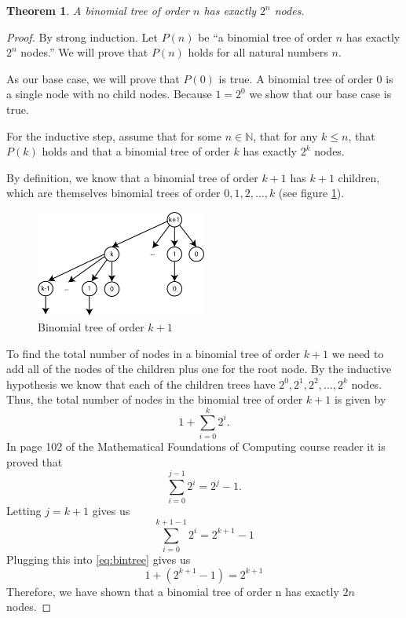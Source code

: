 \documentclass[10pt,letter]{article}
\newtheorem*{thm}{Theorem}
\begin{document}
\begin{thm}
A binomial tree of order $n$ has exactly $2^n$ nodes.
\end{thm}

\begin{proof}
By strong induction. Let $P(n)$ be ``a binomial tree of order $n$ has exactly $2^n$ nodes.'' We will prove that $P(n)$ holds for all natural numbers $n$. 

As our base case, we will prove that $P(0)$ is true. A binomial tree of order 0 is a single node with no child nodes. Because $1 = 2^0$ we show that our base case is true.

For the inductive step, assume that for some $n \in \mathbb{N}$, that for any $k \le n$, that $P(k)$ holds and that a binomial tree of order $k$ has exactly $2^k$ nodes. 

By definition, we know that a binomial tree of order $k+1$ has $k+1$ children, which are themselves binomial trees of order $0, 1, 2, \ldots, k$ (see figure \ref{fig:binTree}).

\begin{figure}[h]
    \centering
    \includegraphics[width=0.5\textwidth]{binTree.png}
    \caption{Binomial tree of order $k+1$}
    \label{fig:binTree}
\end{figure}

To find the total number of nodes in a binomial tree of order $k+1$ we need to add all of the nodes of the children plus one for the root node. By the inductive hypothesis we know that each of the children trees have $2^0, 2^1, 2^2, \ldots, 2^k$ nodes. Thus, the total number of nodes in the binomial tree of order $k+1$ is given by 
\begin{equation} \label{eq:bintree}
1 + \sum_{i=0}^{k} 2^i.
\end{equation} 
In page 102 of the Mathematical Foundations of Computing course reader it is proved that 
\begin{equation*}
\sum_{i=0}^{j-1} 2^i = 2^j - 1.
\end{equation*} 
Letting $j = k+1$ gives us 
\begin{equation*}
\sum_{i=0}^{k+1-1} 2^i = 2^{k+1} - 1
\end{equation*} 
Plugging this into \ref{eq:bintree} gives us
\begin{equation*}
1 + (2^{k+1} - 1) = 2^{k+1}
\end{equation*}
Therefore, we have shown that a binomial tree of order n has exactly $2n$ nodes.
\end{proof}
\end{document}
